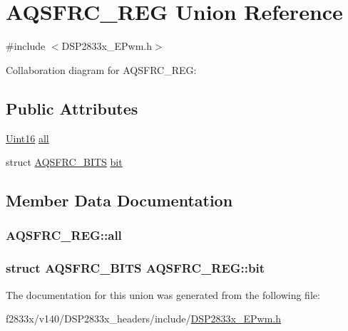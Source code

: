 \hypertarget{union_a_q_s_f_r_c___r_e_g}{}\section{A\+Q\+S\+F\+R\+C\+\_\+\+R\+E\+G Union Reference}
\label{union_a_q_s_f_r_c___r_e_g}


{\ttfamily \#include $<$D\+S\+P2833x\+\_\+\+E\+Pwm.\+h$>$}



Collaboration diagram for A\+Q\+S\+F\+R\+C\+\_\+\+R\+E\+G\+:
\subsection*{Public Attributes}
\begin{DoxyCompactItemize}
\item 
\hyperlink{_d_s_p2833x___device_8h_a59a9f6be4562c327cbfb4f7e8e18f08b}{Uint16} \hyperlink{union_a_q_s_f_r_c___r_e_g_a3115406804540f75d6fac45aa5e0f304}{all}
\item 
struct \hyperlink{struct_a_q_s_f_r_c___b_i_t_s}{A\+Q\+S\+F\+R\+C\+\_\+\+B\+I\+T\+S} \hyperlink{union_a_q_s_f_r_c___r_e_g_a215496b926dba83fd37860bb58ede498}{bit}
\end{DoxyCompactItemize}


\subsection{Member Data Documentation}
\hypertarget{union_a_q_s_f_r_c___r_e_g_a3115406804540f75d6fac45aa5e0f304}{}
\subsubsection[{all}]{ A\+Q\+S\+F\+R\+C\+\_\+\+R\+E\+G\+::all}\label{union_a_q_s_f_r_c___r_e_g_a3115406804540f75d6fac45aa5e0f304}
\hypertarget{union_a_q_s_f_r_c___r_e_g_a215496b926dba83fd37860bb58ede498}{}
\subsubsection[{bit}]{\setlength{\rightskip}{0pt plus 5cm}struct {\bf A\+Q\+S\+F\+R\+C\+\_\+\+B\+I\+T\+S} A\+Q\+S\+F\+R\+C\+\_\+\+R\+E\+G\+::bit}\label{union_a_q_s_f_r_c___r_e_g_a215496b926dba83fd37860bb58ede498}


The documentation for this union was generated from the following file\+:\begin{DoxyCompactItemize}
\item 
f2833x/v140/\+D\+S\+P2833x\+\_\+headers/include/\hyperlink{_d_s_p2833x___e_pwm_8h}{D\+S\+P2833x\+\_\+\+E\+Pwm.\+h}\end{DoxyCompactItemize}
